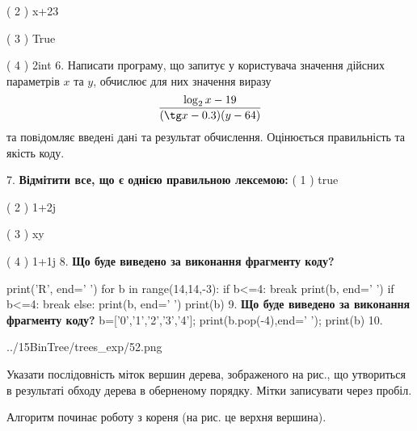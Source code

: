 \documentclass[11pt]{article}
\begin{document}
( 2 ) x+23

( 3 ) True

( 4 ) 2int
\vspace{5mm}
6. 
Написати програму, що запитує у користувача значення дійсних параметрів $x$ та $y$, обчислює для них значення виразу 
$$\frac{\log_{2} x - 19}{(\tg x - 0.3) (y - 64)}$$ 
та повiдомляє введенi данi та результат обчислення.
 Оцінюється правильність та якість коду.

\vspace{5mm}
7. %
\textbf{Відмітити все, що є однією правильною лексемою:}
( 1 ) true

( 2 ) 1+2j

( 3 ) xy

( 4 ) 1+1j
\vspace{5mm}
8. \textbf{Що буде виведено за виконання фрагменту коду?}

print('R', end=' ')
for b in range(14,14,-3):
    if b<=4:
        break
        print(b, end=' ')
    if b<=4:
        break
    else:
        print(b, end=' ')
    print(b)
\vspace{5mm}
9. \textbf{Що буде виведено за виконання фрагменту коду?}
b=['0','1','2','3','4']; print(b.pop(-4),end=' '); print(b)\vspace{5mm}
10. 

\begin{center}
	{../15BinTree/trees_exp/52.png}
\end{center}
Указати послідовність міток вершин дерева, зображеного на рис., що утвориться в результаті обходу дерева в оберненому порядку. Мітки записувати через пробіл.\par Алгоритм починає роботу з кореня (на рис. це верхня вершина).
\vspace{5mm}










\newpage
\end{document}
